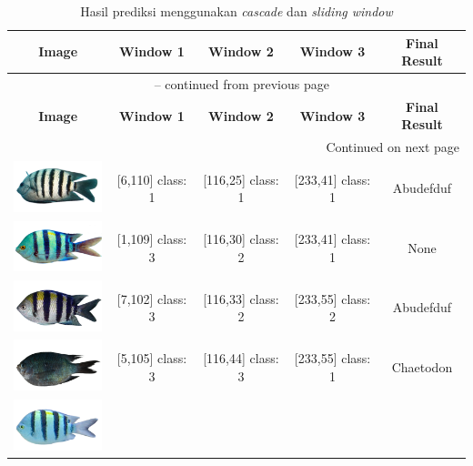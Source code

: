 \begin{longtable}{|c|c|c|c|c|}
	\caption{Hasil prediksi menggunakan \emph{cascade} dan \emph{sliding window}} \label{tab: Classification result} \\
	\hline
	\textbf{Image} & \textbf{Window 1} & \textbf{Window 2} & \textbf{Window 3} & \textbf{Final Result} \\
	\hline
	\endfirsthead
	\multicolumn{5}{c}{{\tablename\ \thetable{} -- continued from previous page}} \\
	\hline
	\textbf{Image} & \textbf{Window 1} & \textbf{Window 2} & \textbf{Window 3} & \textbf{Final Result} \\
	\hline
	\endhead
	\hline \multicolumn{5}{|r|}{{Continued on next page}} \\ \hline
	\endfoot
	\hline
	\endlastfoot
	\includegraphics[width=3cm]{gambar/dataset_validasi/Abudefduf01}
	& [6,110] class: 1 & [116,25] class: 1 & [233,41] class: 1 & Abudefduf \\
	\hline
	\includegraphics[width=3cm]{gambar/dataset_validasi/Abudefduf02}
	& [1,109] class: 3 & [116,30] class: 2 & [233,41] class: 1 & None \\
	\hline
	\includegraphics[width=3cm]{gambar/dataset_validasi/Abudefduf03}
	& [7,102] class: 3 & [116,33] class: 2 & [233,55] class: 2 & Abudefduf \\
	\hline
	\includegraphics[width=3cm]{gambar/dataset_validasi/Abudefduf04}
	& [5,105] class: 3 & [116,44] class: 3 & [233,55] class: 1 & Chaetodon \\
	\hline
	\includegraphics[width=3cm]{gambar/dataset_validasi/Abudefduf05}

\end{longtable}
